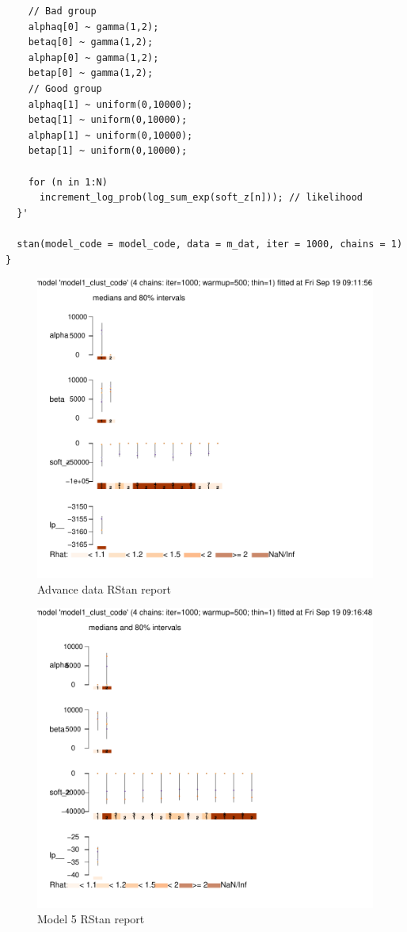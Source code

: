 \documentclass[11pt,a4,singlespacing,titlepagenumber=on]{scrreprt}
\numberwithin{equation}{chapter} %
\theoremstyle{remark}
\begin{document}
\begin{verbatim}
    // Bad group
    alphaq[0] ~ gamma(1,2);  
    betaq[0] ~ gamma(1,2);  
    alphap[0] ~ gamma(1,2);  
    betap[0] ~ gamma(1,2);  
    // Good group
    alphaq[1] ~ uniform(0,10000);  
    betaq[1] ~ uniform(0,10000);  
    alphap[1] ~ uniform(0,10000);  
    betap[1] ~ uniform(0,10000);  

    for (n in 1:N)
      increment_log_prob(log_sum_exp(soft_z[n])); // likelihood
  }'
  
  stan(model_code = model_code, data = m_dat, iter = 1000, chains = 1)
}

\end{verbatim}


\begin{figure}[H]
    \centering
    \includegraphics[scale=0.7]{AdvFit.pdf}
    \caption{Advance data RStan report}
\end{figure}

\begin{figure}[H]
    \centering
    \includegraphics[scale=0.7]{M5Fit.pdf}
    \caption{Model 5 RStan report}
\end{figure}
\end{document}
